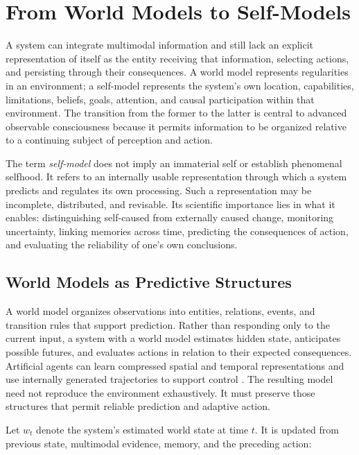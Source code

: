 \section{\textbf{From World Models to Self-Models}}
\label{sec:world-to-self}

A system can integrate multimodal information and still lack an explicit representation of itself as the entity receiving that information, selecting actions, and persisting through their consequences. A world model represents regularities in an environment; a self-model represents the system's own location, capabilities, limitations, beliefs, goals, attention, and causal participation within that environment. The transition from the former to the latter is central to advanced observable consciousness because it permits information to be organized relative to a continuing subject of perception and action.

The term \emph{self-model} does not imply an immaterial self or establish phenomenal selfhood. It refers to an internally usable representation through which a system predicts and regulates its own processing. Such a representation may be incomplete, distributed, and revisable. Its scientific importance lies in what it enables: distinguishing self-caused from externally caused change, monitoring uncertainty, linking memories across time, predicting the consequences of action, and evaluating the reliability of one's own conclusions.

\subsection{World Models as Predictive Structures}
\label{subsec:world-models}

A world model organizes observations into entities, relations, events, and transition rules that support prediction. Rather than responding only to the current input, a system with a world model estimates hidden state, anticipates possible futures, and evaluates actions in relation to their expected consequences. Artificial agents can learn compressed spatial and temporal representations and use internally generated trajectories to support control \cite{ha2018worldmodels}. The resulting model need not reproduce the environment exhaustively. It must preserve those structures that permit reliable prediction and adaptive action.

Let $w_t$ denote the system's estimated world state at time $t$. It is updated from previous state, multimodal evidence, memory, and the preceding action:

